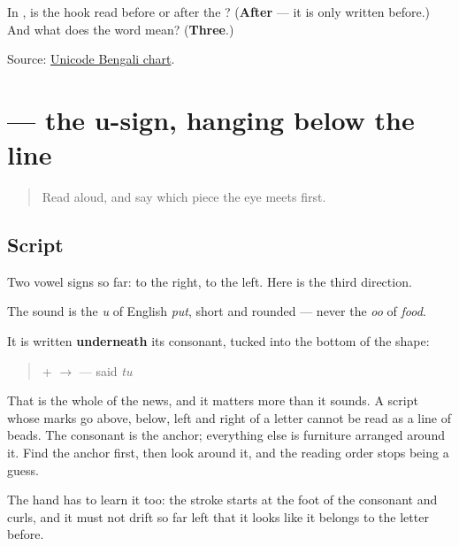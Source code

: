 \begin{tcolorbox}[breakable,colback=teal!4,colframe=teal!35!black,title={Before you move on}]
In \textbf{}, is the hook read before or after the \textbf{}? (\textbf{After} — it is only written before.) And what does the word mean? (\textbf{Three}.)

Source: \href{https://www.unicode.org/charts/PDF/U0980.pdf}{Unicode Bengali chart}.
\end{tcolorbox}
\section[-u]{ — the u-sign, hanging below the line}

\label{lesson:BN-W02-u-matra}



\begin{quote}
Read \textbf{} aloud, and say which piece the eye meets first.
\end{quote}

\subsection*{Script}
Two vowel signs so far: \textbf{} to the right, \textbf{} to the left. Here is the third direction.

\begin{quote}
\end{quote}

The sound is the \emph{u} of English \emph{put}, short and rounded — never the \emph{oo} of \emph{food}.

It is written \textbf{underneath} its consonant, tucked into the bottom of the shape:

\begin{quote}
\textbf{} + \textbf{} $\to$ \textbf{} — said \emph{tu}
\end{quote}

That is the whole of the news, and it matters more than it sounds. A script whose marks go above, below, left and right of a letter cannot be read as a line of beads. The consonant is the anchor; everything else is furniture arranged around it. Find the anchor first, then look around it, and the reading order stops being a guess.

The hand has to learn it too: the stroke starts at the foot of the consonant and curls, and it must not drift so far left that it looks like it belongs to the letter before.

